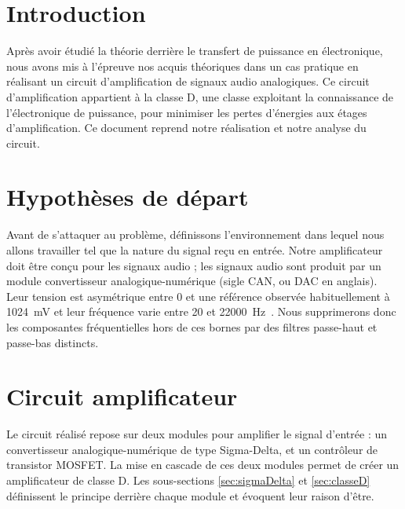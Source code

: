 \documentclass[10pt, oneside, a4paper]{article}
\begin{document}
\tableofcontents
\newpage

\section*{Introduction}
Après avoir étudié la théorie derrière le transfert de puissance en électronique,
nous avons mis à l'épreuve nos acquis théoriques dans un cas pratique en réalisant un circuit d'amplification de signaux audio analogiques.
Ce circuit d'amplification appartient à la classe D, une classe exploitant la connaissance de l'électronique de puissance, pour minimiser les pertes d'énergies aux étages d'amplification.
Ce document reprend notre réalisation et notre analyse du circuit.


\section{Hypothèses de départ}
\label{sec:hypothese}
Avant de s'attaquer au problème, définissons l'environnement dans lequel nous allons travailler tel que la nature du signal reçu en entrée.
Notre amplificateur doit être conçu pour les signaux audio ;
les signaux audio sont produit par un module convertisseur analogique-numérique (sigle CAN, ou DAC en anglais).
Leur tension est asymétrique entre \num{0} et une référence observée habituellement à \SI{1024}{\milli\volt} et leur fréquence varie entre \num{20} et \SI{22000}{\hertz}~\cite{heffner2007hearing}.
Nous supprimerons donc les composantes fréquentielles hors de ces bornes par des filtres passe-haut et passe-bas distincts.


\section{Circuit amplificateur}
Le circuit réalisé repose sur deux modules pour amplifier le signal d'entrée :
un convertisseur analogique-numérique de type Sigma-Delta, et un contrôleur de transistor MOSFET.
La mise en cascade de ces deux modules permet de créer un amplificateur de classe D.
Les sous-sections \ref{sec:sigmaDelta} et \ref{sec:classeD} définissent le principe derrière chaque module et évoquent leur raison d'être.
\end{document}
